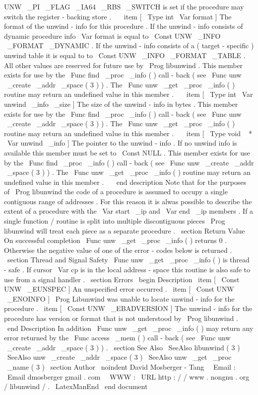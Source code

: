 {
UNW
\
_PI
\
_FLAG
\
_IA64
\
_RBS
\
_SWITCH
}
is
set
if
the
procedure
may
switch
the
register
-
backing
store
.
\
\
\
item
[
\
Type
{
int
}
\
Var
{
format
}
]
The
format
of
the
unwind
-
info
for
this
procedure
.
If
the
unwind
-
info
consists
of
dynamic
procedure
info
\
Var
{
format
}
is
equal
to
\
Const
{
UNW
\
_INFO
\
_FORMAT
\
_DYNAMIC
}
.
If
the
unwind
-
info
consists
of
a
(
target
-
specific
)
unwind
table
it
is
equal
to
to
\
Const
{
UNW
\
_INFO
\
_FORMAT
\
_TABLE
}
.
All
other
values
are
reserved
for
future
use
by
\
Prog
{
libunwind
}
.
This
member
exists
for
use
by
the
\
Func
{
find
\
_proc
\
_info
}
(
)
call
-
back
(
see
\
Func
{
unw
\
_create
\
_addr
\
_space
}
(
3
)
)
.
The
\
Func
{
unw
\
_get
\
_proc
\
_info
}
(
)
routine
may
return
an
undefined
value
in
this
member
.
\
\
\
item
[
\
Type
{
int
}
\
Var
{
unwind
\
_info
\
_size
}
]
The
size
of
the
unwind
-
info
in
bytes
.
This
member
exists
for
use
by
the
\
Func
{
find
\
_proc
\
_info
}
(
)
call
-
back
(
see
\
Func
{
unw
\
_create
\
_addr
\
_space
}
(
3
)
)
.
The
\
Func
{
unw
\
_get
\
_proc
\
_info
}
(
)
routine
may
return
an
undefined
value
in
this
member
.
\
\
\
item
[
\
Type
{
void
~
*
}
\
Var
{
unwind
\
_info
}
]
The
pointer
to
the
unwind
-
info
.
If
no
unwind
info
is
available
this
member
must
be
set
to
\
Const
{
NULL
}
.
This
member
exists
for
use
by
the
\
Func
{
find
\
_proc
\
_info
}
(
)
call
-
back
(
see
\
Func
{
unw
\
_create
\
_addr
\
_space
}
(
3
)
)
.
The
\
Func
{
unw
\
_get
\
_proc
\
_info
}
(
)
routine
may
return
an
undefined
value
in
this
member
.
\
\
\
end
{
description
}
Note
that
for
the
purposes
of
\
Prog
{
libunwind
}
the
code
of
a
procedure
is
assumed
to
occupy
a
single
contiguous
range
of
addresses
.
For
this
reason
it
is
alwas
possible
to
describe
the
extent
of
a
procedure
with
the
\
Var
{
start
\
_ip
}
and
\
Var
{
end
\
_ip
}
members
.
If
a
single
function
/
routine
is
split
into
multiple
discontiguous
pieces
\
Prog
{
libunwind
}
will
treat
each
piece
as
a
separate
procedure
.
\
section
{
Return
Value
}
On
successful
completion
\
Func
{
unw
\
_get
\
_proc
\
_info
}
(
)
returns
0
.
Otherwise
the
negative
value
of
one
of
the
error
-
codes
below
is
returned
.
\
section
{
Thread
and
Signal
Safety
}
\
Func
{
unw
\
_get
\
_proc
\
_info
}
(
)
is
thread
-
safe
.
If
cursor
\
Var
{
cp
}
is
in
the
local
address
-
space
this
routine
is
also
safe
to
use
from
a
signal
handler
.
\
section
{
Errors
}
\
begin
{
Description
}
\
item
[
\
Const
{
UNW
\
_EUNSPEC
}
]
An
unspecified
error
occurred
.
\
item
[
\
Const
{
UNW
\
_ENOINFO
}
]
\
Prog
{
Libunwind
}
was
unable
to
locate
unwind
-
info
for
the
procedure
.
\
item
[
\
Const
{
UNW
\
_EBADVERSION
}
]
The
unwind
-
info
for
the
procedure
has
version
or
format
that
is
not
understood
by
\
Prog
{
libunwind
}
.
\
end
{
Description
}
In
addition
\
Func
{
unw
\
_get
\
_proc
\
_info
}
(
)
may
return
any
error
returned
by
the
\
Func
{
access
\
_mem
}
(
)
call
-
back
(
see
\
Func
{
unw
\
_create
\
_addr
\
_space
}
(
3
)
)
.
\
section
{
See
Also
}
\
SeeAlso
{
libunwind
(
3
)
}
\
SeeAlso
{
unw
\
_create
\
_addr
\
_space
(
3
)
}
\
SeeAlso
{
unw
\
_get
\
_proc
\
_name
(
3
)
}
\
section
{
Author
}
\
noindent
David
Mosberger
-
Tang
\
\
Email
:
\
Email
{
dmosberger
gmail
.
com
}
\
\
WWW
:
\
URL
{
http
:
/
/
www
.
nongnu
.
org
/
libunwind
/
}
.
\
LatexManEnd
\
end
{
document
}
